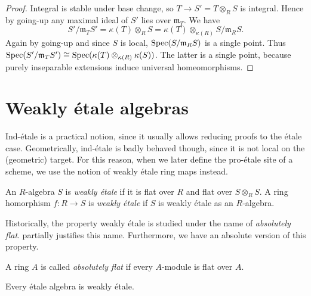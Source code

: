 \begin{proof}
    Integral is stable under base change, so $T \to S' = T \otimes_{R} S$ is integral. Hence by going-up
    any maximal ideal of $S'$ lies over $\mathfrak{m}_T$. We have
    \[
        S' / \mathfrak{m}_T S' = \kappa(T) \otimes_{R} S = \kappa(T) \otimes_{\kappa(R)} S / \mathfrak{m}_R S
    .\] Again by going-up and since $S$ is local, $\mathrm{Spec}(S / \mathfrak{m}_R S)$ is
    a single point. Thus $\mathrm{Spec}(S' / \mathfrak{m}_T S') \cong \mathrm{Spec}(\kappa(T) \otimes_{\kappa(R)} \kappa(S))$.
    The latter is a single point, because purely inseparable extensions induce
    universal homeomorphisms.
\end{proof}

\section{Weakly étale algebras}

Ind-étale is a practical notion, since it usually allows reducing proofs to the étale case. Geometrically,
ind-étale is badly behaved though, since it is not local on the (geometric) target. For this reason, when we later
define the pro-étale site of a scheme, we use the notion of weakly étale ring maps instead.

\begin{definition}
    An $R$-algebra $S$ is \emph{weakly étale} if it is flat over $R$ and flat over $S \otimes_{R} S$.
    A ring homorphism $f \colon R \to S$ is \emph{weakly étale} if $S$ is weakly étale as an $R$-algebra.
    \label{def:weakly-etale-algebra}
    \leanok
\end{definition}

Historically, the property weakly étale is studied under the name of \emph{absolutely flat}. 
 partially justifies this name. Furthermore, we have an absolute version 
of this property.

\begin{definition}
    \label{def:absolutely-flat}
    A ring $A$ is called \emph{absolutely flat} if every $A$-module is flat over $A$. 
    \leanok
\end{definition}

\begin{lemma}
    Every étale algebra is weakly étale.
    \label{lemma:etale-weakly-etale-algebra}
    \leanok
    \mathlibok
\end{lemma}


